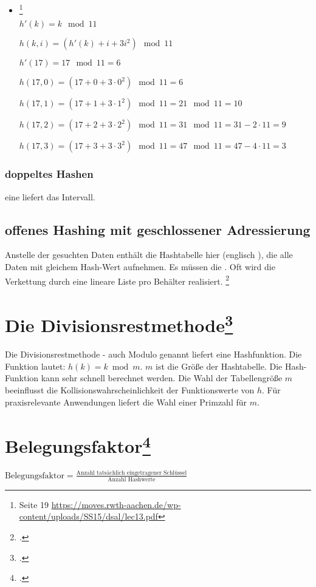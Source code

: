 \documentclass{lehramt-informatik-haupt}
\begin{document}
\begin{itemize}
%

\item {}
\footnote{Seite 19 \url{https://moves.rwth-aachen.de/wp-content/uploads/SS15/dsal/lec13.pdf}}

$h'(k) = k \mod 11$

$h(k, i) = (h'(k) + i + 3i^2) \mod 11$

$h'(17) = 17 \mod 11 = 6$


$h(17, 0) = (17 + 0 + 3 \cdot 0^2) \mod 11 = 6$

$h(17, 1) = (17 + 1 + 3 \cdot 1^2) \mod 11 = 21 \mod 11 = 10$

$h(17, 2) = (17 + 2 + 3 \cdot 2^2) \mod 11 = 31 \mod 11 = 31 - 2 \cdot 11 = 9$

$h(17, 3) = (17 + 3 + 3 \cdot 3^2) \mod 11 = 47 \mod 11 = 47 - 4 \cdot 11 = 3$

\end{itemize}

\subsubsection{doppeltes Hashen}

eine  liefert das Intervall.

%

\subsection{offenes Hashing mit geschlossener Adressierung}

Anstelle der gesuchten Daten enthält die Hashtabelle hier
 (englisch ), die alle Daten mit gleichem
Hash-Wert aufnehmen. Es müssen die . Oft wird die Verkettung durch eine lineare Liste pro
Behälter realisiert.
\footcite{wiki:hashtabelle}

%

\section{Die Divisionsrestmethode\footcite{wiki:divisionsrestmethode}}

Die Divisionsrestmethode - auch Modulo genannt liefert eine
Hashfunktion. Die Funktion lautet:  $h(k)=k{\bmod {m}}$. $m$ ist die
Größe der Hashtabelle. Die Hash-Funktion kann sehr schnell berechnet
werden. Die Wahl der Tabellengröße $m$ beeinflusst die
Kollisionswahrscheinlichkeit der Funktionswerte von $h$. Für
praxisrelevante Anwendungen liefert die Wahl einer Primzahl für $m$.

\section{Belegungsfaktor\footcite[Seite 29]{aud:fs:tafeluebung-10}}

$\text{Belegungsfaktor} =
\frac{\text{Anzahl tatsächlich eingetragener Schlüssel}}
{\text{Anzahl Hashwerte}}$

\literatur
\end{document}
